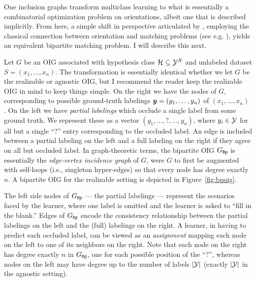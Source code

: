 One inclusion graphs transform multiclass learning to what is essentially a combinatorial optimization problem on orientations, albeit one that is described implicitly. From here, a simple shift in perspective articulated by \cite{asilis_regularization_2024}, employing the classical connection between orientation and matching problems (see e.g. \cite{Schrijver_2003}), yields an equivalent bipartite matching problem. I will describe this next.

Let $G$ be an OIG associated with hypothesis class $\mathcal{H} \subseteq \mathcal{Y}^{\mathcal{X}}$ and unlabeled dataset $S=(x_1,\ldots,x_n)$. The transformation is essentially identical whether we let $G$ be the realizable or agnostic OIG, but I recommend the reader keep the realizable OIG in mind to keep things simple. On the right we have the  nodes of $G$, corresponding to possible ground-truth labelings $\boldsymbol{ y }=(y_1,\ldots,y_n)$ of  $(x_1,\ldots,x_n)$ . On the left we have \emph{partial labelings} which occlude a single label from some ground truth. We represent these as a vector $(y_1, \ldots, ?, \ldots, y_n)$,  where $y_i \in \mathcal{Y}$ for all but a single ``?'' entry corresponding to the occluded label. An edge is included between a partial labeling on the left and a full labeling on the right if they agree on all but occluded label. 
In graph-theoretic terms,  the bipartite OIG $G_{\mathtt{Bp}}$ is essentially  the \emph{edge-vertex incidence graph} of $G$, were $G$ to first be augmented with self-loops (i.e., singleton hyper-edges) so that every node has degree exactly~$n$. %
A bipartite OIG for the realizable setting is depicted in Figure~\ref{fig:bpoig}.

The  left side nodes of $G_{\mathtt{Bp}}$ --- the partial labelings --- represent the scenarios faced by the learner, where one label is omitted and the learner is asked to ``fill in the blank.'' Edges of $G_{\mathtt{Bp}}$ encode the consistency relationship between the partial labelings on the left and the (full) labelings on the right. A learner, in having to predict each occluded label, can be viewed as an \emph{assignment} mapping each node on the left to one of its neighbors on the right. Note that each node on the right has degree exactly $n$ in $G_{\mathtt{Bp}}$, one for each possible position of the ``?'',  whereas nodes on the left may have degree up to the number of labels $|\mathcal{Y}|$ (exactly $|\mathcal{Y}|$ in the agnostic setting). %


